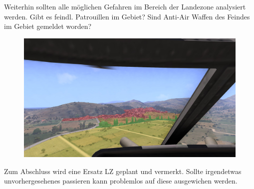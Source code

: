 	Weiterhin sollten alle möglichen Gefahren im Bereich der Landezone analysiert werden. Gibt es feindl. Patrouillen im Gebiet? Sind Anti-Air Waffen des Feindes im Gebiet gemeldet worden?
	\begin{figure}[htbp]
		\centering
		\includegraphics[width=0.95\linewidth]{./img/fortgeschrittenes/hubschrauberUndInfanterie/sicht-pilot}
	\end{figure}
			
	Zum Abschluss wird eine Ersatz \ac{LZ} geplant und vermerkt. Sollte irgendetwas unvorhergesehenes passieren kann problemlos auf diese ausgewichen werden.

